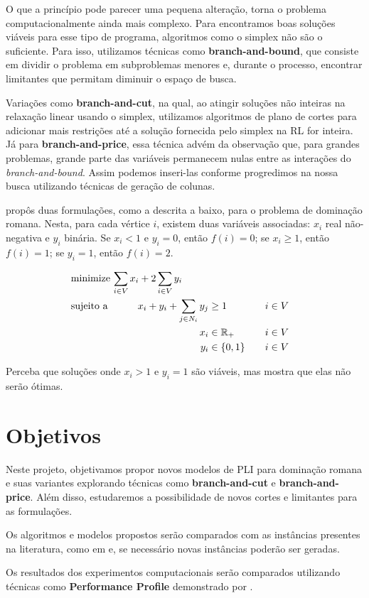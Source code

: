 \documentclass[11pt]{article}
\begin{document}
O que a princípio pode parecer uma pequena alteração, torna o problema computacionalmente ainda mais complexo. Para encontramos boas soluções viáveis para esse tipo de programa, algoritmos como o simplex não são o suficiente. Para isso, utilizamos técnicas como \textbf{branch-and-bound}, que consiste em dividir o problema em subproblemas menores e, durante o processo, encontrar limitantes que permitam diminuir o espaço de busca.

Variações como \textbf{branch-and-cut}, na qual, ao atingir soluções não inteiras na relaxação linear usando o simplex, utilizamos algoritmos de plano de cortes para adicionar mais restrições até a solução fornecida pelo simplex na RL for inteira.
Já para \textbf{branch-and-price}, essa técnica advém da observação que, para grandes problemas, grande parte das variáveis permanecem nulas entre as interações do \emph{branch-and-bound}.
Assim podemos inseri-las conforme progredimos na nossa busca utilizando técnicas de geração de colunas.

\textcite{Ivanovic2016Improvedmixedinteger} propôs duas formulações, como a descrita a baixo, para o problema de dominação romana.
Nesta, para cada vértice \(i\), existem duas variáveis associadas: \(x_i\) real não-negativa e \(y_i\) binária. Se \(x_i < 1\) e \(y_i = 0\), então \(f(i) = 0\); se \(x_i \geq 1\), então \(f(i) = 1\); se \(y_i = 1\), então \(f(i) = 2\).

\begin{alignat*}{4}
& \omit\rlap{minimize  $\displaystyle \sum_{i \in V} x_i+2\sum_{i \in V} y_i$} \\
& \mbox{sujeito a}&& \quad & x_i+y_i+\sum_{j \in N_i} y_j & \geq 1  & \quad & i \in V \\
&                 &&       & x_i               & \in \mathbb{R}_+ &      & i \in V \\
&                 &&       & y_i               & \in \{0,1\}      &      & i \in V
\end{alignat*}

Perceba que soluções onde \(x_i > 1\) e \(y_i = 1\) são viáveis, mas \textcite{Ivanovic2016Improvedmixedinteger} mostra que elas não serão ótimas.

\section{Objetivos}
\label{sec:org2bf008b}
Neste projeto, objetivamos propor novos modelos de PLI para dominação romana e suas variantes explorando técnicas como \textbf{branch-and-cut} e \textbf{branch-and-price}.
Além disso, estudaremos a possibilidade de novos cortes e limitantes para as formulações.

Os algoritmos e modelos propostos serão comparados com as instâncias presentes na literatura, como em \textcite{Curro2014RomanDominationProblem} e, se necessário novas instâncias poderão ser geradas.

Os resultados dos experimentos computacionais serão comparados utilizando técnicas como \textbf{Performance Profile} demonstrado por \textcite{Dolan2002Benchmarkingoptimizationsoftware}.

\printbibliography
\end{document}

